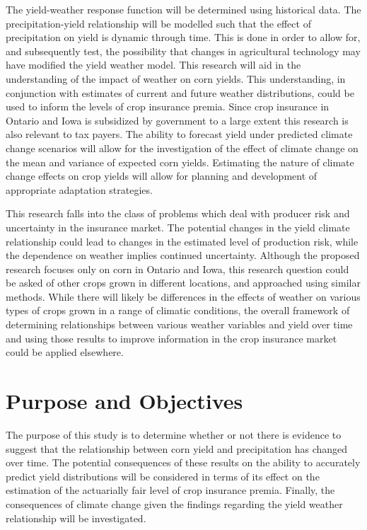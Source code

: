 The yield-weather response function will be determined using historical data. The precipitation-yield relationship will be modelled such that the effect of precipitation on yield is dynamic through time. This is done in order to allow for, and subsequently test, the possibility that changes in agricultural technology may have modified the yield weather model. This research will aid in the understanding of the impact of weather on corn yields. This understanding, in conjunction with estimates of current and future weather distributions, could be used to inform the levels of crop insurance premia. Since crop insurance in Ontario and Iowa is subsidized by government to a large extent this research is also relevant to tax payers. The ability to forecast yield under predicted climate change scenarios will allow for the investigation of the effect of climate change on the mean and variance of expected corn yields.  Estimating the nature of climate change effects on crop yields will allow for planning and development of appropriate adaptation strategies. 

This research falls into the class of problems which deal with producer risk and uncertainty in the insurance market. The potential changes in the yield climate relationship could lead to changes in the estimated level of production risk, while the dependence on weather implies continued uncertainty. Although the proposed research focuses only on corn in Ontario and Iowa, this research question could be asked of other crops grown in different locations, and approached using similar methods. While there will likely be differences in the effects of weather on various types of crops grown in a range of climatic conditions, the overall framework of determining relationships between various weather variables and yield over time and using those results to improve information in the crop insurance market could be applied elsewhere. 

\section{Purpose and Objectives}

The purpose of this study is to determine whether or not there is evidence to suggest that the relationship between corn yield and precipitation has changed over time. The potential consequences of these results on the ability to accurately predict yield distributions will be considered in terms of its effect on the estimation of the actuarially fair level of crop insurance premia. Finally, the consequences of climate change given the findings regarding the yield weather relationship will be investigated.

